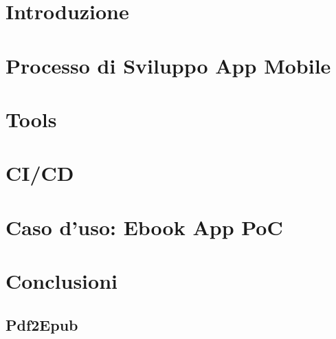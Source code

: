 \documentclass[12pt,a4paper]{report}
\begin{document}
\tableofcontents

\chapter{Introduzione}
\label{ch:introduzione}


\chapter{Processo di Sviluppo App Mobile}
\label{ch:kmm}


\chapter{Tools}
\label{ch:ch3}


\chapter{CI/CD}
\label{ch:ch4}


\chapter{Caso d'uso: Ebook App PoC}
\label{ch:ch5}


\chapter{Conclusioni}
\label{ch:ch6}





\setcounter{section}{0}%

\begin{appendices}
\chapter{Pdf2Epub}
\label{appendix:ch7}

\end{appendices}
\end{document}
